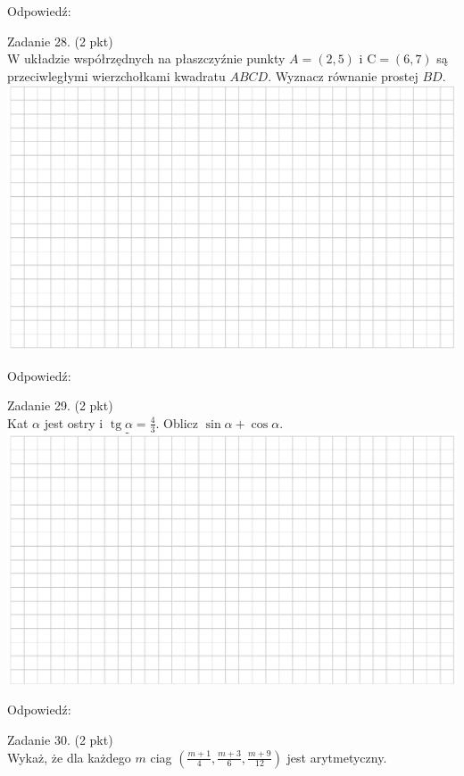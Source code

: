 \documentclass[10pt]{article}
\begin{document}
Odpowiedź:

Zadanie 28. (2 pkt)\\
W układzie współrzędnych na płaszczyźnie punkty \(A=(2,5)\) i \(\mathrm{C}=(6,7)\) są przeciwległymi wierzchołkami kwadratu \(A B C D\). Wyznacz równanie prostej \(B D\).\\
\includegraphics[max width=\textwidth, center]{2024_11_21_ad52a81220b9b2239458g-11(1)}

Odpowiedź:

Zadanie 29. (2 pkt)\\
Kat \(\alpha\) jest ostry i \(\operatorname{tg} \alpha=\frac{4}{3}\). Oblicz \(\sin \alpha+\cos \alpha\).\\
\includegraphics[max width=\textwidth, center]{2024_11_21_ad52a81220b9b2239458g-11}

Odpowiedź:

Zadanie 30. (2 pkt)\\
Wykaż, że dla każdego \(m\) ciag \(\left(\frac{m+1}{4}, \frac{m+3}{6}, \frac{m+9}{12}\right)\) jest arytmetyczny.
\end{document}
